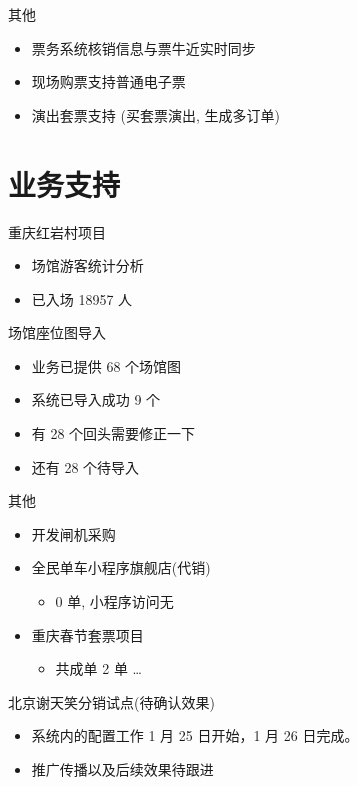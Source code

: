 \documentclass[presentation, bigger]{beamer}
\begin{document}
\begin{frame}[label={sec:org0229188}]{其他}
\begin{itemize}
\item 票务系统核销信息与票牛近实时同步
\item 现场购票支持普通电子票
\item 演出套票支持 (买套票演出, 生成多订单)
\end{itemize}
\end{frame}

\section{业务支持}
\label{sec:org0bf0f40}
\begin{frame}[label={sec:org51dea6a}]{重庆红岩村项目}
\begin{itemize}
\item 场馆游客统计分析
\item 已入场 18957 人
\end{itemize}
\end{frame}

\begin{frame}[label={sec:org163bf42}]{场馆座位图导入}
\begin{itemize}
\item 业务已提供 68 个场馆图
\item 系统已导入成功 9 个
\item 有 28 个回头需要修正一下
\item 还有 28 个待导入
\end{itemize}
\end{frame}

\begin{frame}[label={sec:orgf9b8711}]{其他}
\begin{itemize}
\item 开发闸机采购
\item 全民单车小程序旗舰店(代销)
\begin{itemize}
\item 0 单, 小程序访问无
\end{itemize}
\item 重庆春节套票项目
\begin{itemize}
\item 共成单 2 单 \ldots{}
\end{itemize}
\end{itemize}
\end{frame}
\begin{frame}[label={sec:org114aade}]{北京谢天笑分销试点(待确认效果)}
\begin{itemize}
\item 系统内的配置工作 1 月 25 日开始，1 月 26 日完成。
\item 推广传播以及后续效果待跟进
\end{itemize}
\end{frame}
\end{document}

